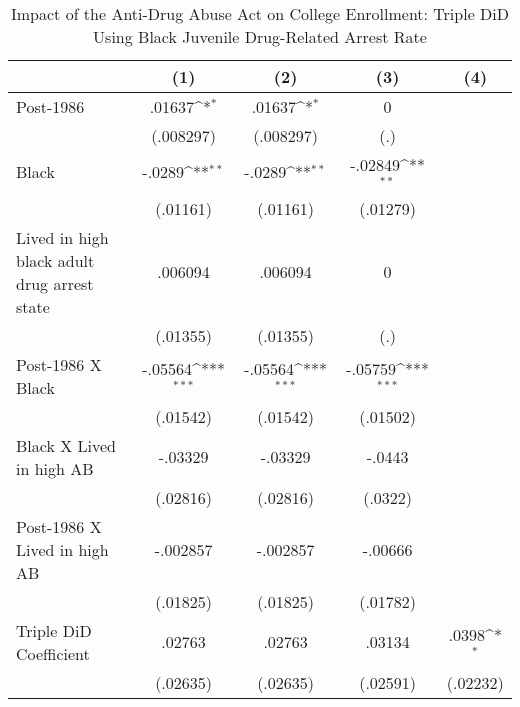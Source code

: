 \begin{table}[htbp]\centering
\def\sym#1{\ifmmode^{#1}\else\(^{#1}\)\fi}
\caption{Impact of the Anti-Drug Abuse Act on College Enrollment: Triple DiD Using Black Juvenile Drug-Related Arrest Rate}
\begin{tabular}{l*{4}{c}}
\hline\hline
                    &\multicolumn{1}{c}{(1)}         &\multicolumn{1}{c}{(2)}         &\multicolumn{1}{c}{(3)}         &\multicolumn{1}{c}{(4)}         \\
\hline
Post-1986           &      .01637\sym{*}  &      .01637\sym{*}  &           0         &                     \\
                    &   (.008297)         &   (.008297)         &         (.)         &                     \\
[1em]
Black               &      -.0289\sym{**} &      -.0289\sym{**} &     -.02849\sym{**} &                     \\
                    &    (.01161)         &    (.01161)         &    (.01279)         &                     \\
[1em]
Lived in high black adult drug arrest state&     .006094         &     .006094         &           0         &                     \\
                    &    (.01355)         &    (.01355)         &         (.)         &                     \\
[1em]
Post-1986 X Black   &     -.05564\sym{***}&     -.05564\sym{***}&     -.05759\sym{***}&                     \\
                    &    (.01542)         &    (.01542)         &    (.01502)         &                     \\
[1em]
Black X Lived in high AB&     -.03329         &     -.03329         &      -.0443         &                     \\
                    &    (.02816)         &    (.02816)         &     (.0322)         &                     \\
[1em]
Post-1986 X Lived in high AB&    -.002857         &    -.002857         &     -.00666         &                     \\
                    &    (.01825)         &    (.01825)         &    (.01782)         &                     \\
[1em]
Triple DiD Coefficient&      .02763         &      .02763         &      .03134         &       .0398\sym{*}  \\
                    &    (.02635)         &    (.02635)         &    (.02591)         &    (.02232)         \\

\end{tabular}
\end{table}
